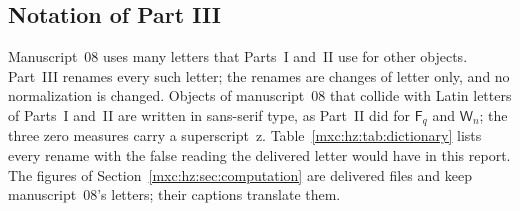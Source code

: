 \documentclass[11pt]{article}
\numberwithin{equation}{section}
\theoremstyle{definition}
\theoremstyle{remark}
\begin{document}
\subsection{Notation of Part III}\label{mxc:hz:sec:notation}
Manuscript~08 uses many letters that Parts~I and~II use for other objects.
Part~III renames every such letter; the renames are changes of letter only,
and no normalization is changed. Objects of manuscript~08 that collide with
Latin letters of Parts~I and~II are written in sans-serif type, as Part~II
did for $\mathsf F_q$ and $\mathsf W_n$; the three zero measures carry a
superscript~$\mathrm z$. Table~\ref{mxc:hz:tab:dictionary} lists every
rename with the false reading the delivered letter would have in this
report. The figures of Section~\ref{mxc:hz:sec:computation} are delivered
files and keep manuscript~08's letters; their captions translate them.
\end{document}
